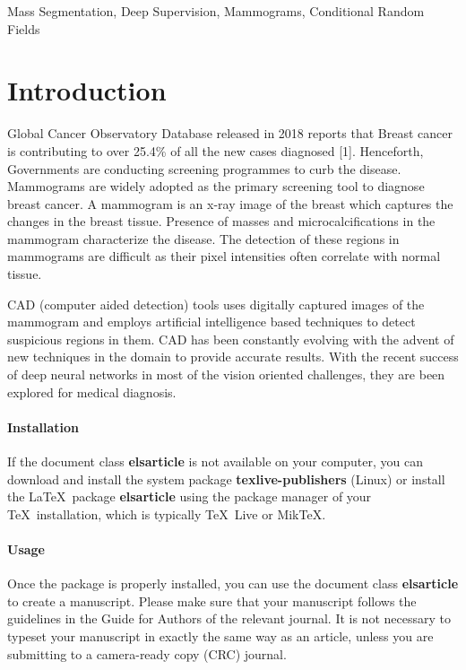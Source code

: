 \documentclass[review]{elsarticle}
\newcommand{\<}{${<}$}
\renewcommand{\emph}{\textbf}   %
\begin{document}
\begin{frontmatter}
\begin{keyword}
 Mass Segmentation, Deep Supervision, Mammograms, Conditional Random Fields
\end{keyword}

\end{frontmatter}

\linenumbers

\section{Introduction}

Global Cancer Observatory Database released in 2018 reports that Breast cancer is contributing to over 25.4\% of all the new cases diagnosed \citep{}[1].  Henceforth, Governments are conducting screening programmes to curb the disease. Mammograms are widely adopted as  the primary screening tool to diagnose breast cancer. A mammogram is an x-ray image of the breast which captures the changes in the breast tissue. Presence of masses and microcalcifications in the mammogram characterize the disease. The detection of these regions in mammograms are difficult as their pixel intensities often correlate with normal tissue. 

CAD (computer aided detection) tools uses digitally captured images of the mammogram and employs artificial intelligence based techniques to detect suspicious regions in them. CAD has been constantly evolving with the advent of new techniques in the domain to provide accurate results. With the recent success of deep neural networks in most of the vision oriented challenges, they are been explored for medical diagnosis. 


\paragraph{Installation} If the document class \emph{elsarticle} is not available on your computer, you can download and install the system package \emph{texlive-publishers} (Linux) or install the \LaTeX\ package \emph{elsarticle} using the package manager of your \TeX\ installation, which is typically \TeX\ Live or Mik\TeX.

\paragraph{Usage} Once the package is properly installed, you can use the document class \emph{elsarticle} to create a manuscript. Please make sure that your manuscript follows the guidelines in the Guide for Authors of the relevant journal. It is not necessary to typeset your manuscript in exactly the same way as an article, unless you are submitting to a camera-ready copy (CRC) journal.
\end{document}
